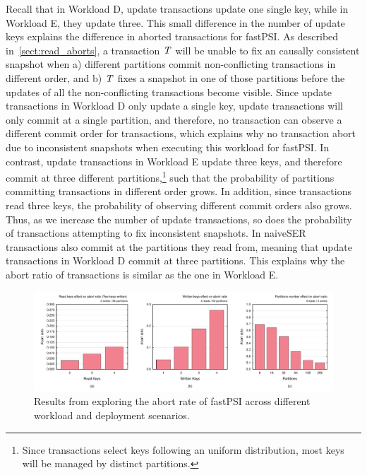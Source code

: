 Recall that in Workload D, update transactions update one single key, while in Workload E, they update three. This small difference in the number of update keys explains the difference in aborted transactions for fastPSI. As described in~\ref{sect:read_aborts}, a transaction $\mathit{T}$ will be unable to fix an causally consistent snapshot when a) different partitions commit non-conflicting transactions in different order, and b) $\mathit{T}$ fixes a snapshot in one of those partitions before the updates of all the non-conflicting transactions become visible. Since update transactions in Workload D only update a single key, update transactions will only commit at a single partition, and therefore, no transaction can observe a different commit order for transactions, which explains why no transaction abort due to inconsistent snapshots when executing this workload for fastPSI. In contrast, update transactions in Workload E update three keys, and therefore commit at three different partitions,\footnote{Since transactions select keys following an uniform distribution, most keys will be managed by distinct partitions.} such that the probability of partitions committing transactions in different order grows. In addition, since transactions read three keys, the probability of observing different commit orders also grows. Thus, as we increase the number of update transactions, so does the probability of transactions attempting to fix inconsistent snapshots. In naiveSER transactions also commit at the partitions they read from, meaning that update transactions in Workload D commit at three partitions. This explains why the abort ratio of transactions is similar as the one in Workload E.

\begin{figure}[t]
\begin{center}
\includegraphics[width=\textwidth]{figures/psi_read_abort_bench.pdf}
\vspace{-1cm}
\end{center}
\caption{Results from exploring the abort rate of fastPSI across different workload and deployment scenarios.}
\label{fig:fastpsi_abort_rate}
\end{figure}

